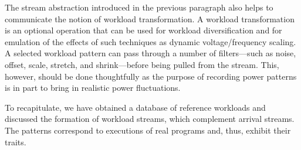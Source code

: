The stream abstraction introduced in the previous paragraph also helps to
communicate the notion of workload transformation. A workload transformation is
an optional operation that can be used for workload diversification and for
emulation of the effects of such techniques as dynamic voltage/frequency
scaling. A selected workload pattern can pass through a number of filters---such
as noise, offset, scale, stretch, and shrink---before being pulled from the
stream. This, however, should be done thoughtfully as the purpose of recording
power patterns is in part to bring in realistic power fluctuations.

To recapitulate, we have obtained a database of reference workloads and
discussed the formation of workload streams, which complement arrival streams.
The patterns correspond to executions of real programs and, thus, exhibit their
traits.
